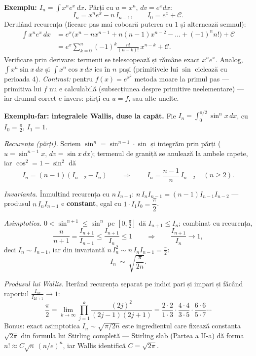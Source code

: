 \textbf{Exemplu: $I_n=\displaystyle\int x^n e^x\,dx$.} Părți cu $u=x^n$, $dv=e^x dx$:
\[
I_n=x^n e^x-n\,I_{n-1},\qquad I_0=e^x+\mathcal C.
\]
Derulând recurența (fiecare pas mai coboară puterea cu $1$ și alternează semnul):
\[
\begin{aligned}
\int x^n e^x\,dx&=e^{x}\Big(x^n-nx^{n-1}+n(n-1)x^{n-2}-\dots+(-1)^n n!\Big)+\mathcal C\\
&=e^x\sum_{k=0}^{n}(-1)^k\frac{n!}{(n-k)!}\,x^{n-k}+\mathcal C.
\end{aligned}
\]
Verificare prin derivare: termenii se telescopează și rămâne exact $x^ne^x$. Analog, $\int x^n\sin x\,dx$ și $\int x^n\cos x\,dx$ ies în $n$ pași (primitivele lui $\sin$ ciclează cu perioada $4$). \emph{Contrast:} pentru $f(x)=e^{x^2}$ metoda moare la primul pas --- primitiva lui $f$ nu e calculabilă (subsecțiunea despre primitive neelementare) --- iar drumul corect e invers: părți cu $u=f$, sau alte unelte.

\medskip
\textbf{Exemplu-far: integralele Wallis, duse la capăt.} Fie $I_n=\displaystyle\int_0^{\pi/2}\sin^n x\,dx$, cu $I_0=\frac\pi2$, $I_1=1$.

\emph{Recurența (părți).} Scriem $\sin^n=\sin^{n-1}\cdot\sin$ și integrăm prin părți ($u=\sin^{n-1}x$, $dv=\sin x\,dx$); termenul de graniță se anulează la ambele capete, iar $\cos^2=1-\sin^2$ dă
\[
I_n=(n-1)(I_{n-2}-I_n)
\qquad\Longrightarrow\qquad
\boxed{\,I_n=\frac{n-1}{n}\,I_{n-2}\,}\quad(n\ge2).
\]

\emph{Invarianta.} Înmulțind recurența cu $n\,I_{n-1}$: $n\,I_nI_{n-1}=(n-1)I_{n-1}I_{n-2}$ --- produsul $n\,I_nI_{n-1}$ e \textbf{constant}, egal cu $1\cdot I_1I_0=\dfrac\pi2$.

\emph{Asimptotica.} $0<\sin^{n+1}\le\sin^n$ pe $[0,\frac\pi2]$ dă $I_{n+1}\le I_n$; combinat cu recurența,
\[
\frac{n}{n+1}=\frac{I_{n+1}}{I_{n-1}}\le\frac{I_{n+1}}{I_n}\le1
\qquad\Longrightarrow\qquad
\frac{I_{n+1}}{I_n}\to1,
\]
deci $I_n\sim I_{n-1}$, iar din invariantă $n\,I_n^2\sim n\,I_nI_{n-1}=\frac\pi2$:
\[
I_n\ \sim\ \sqrt{\frac{\pi}{2n}}.
\]

\emph{Produsul lui Wallis.} Iterând recurența separat pe indici pari și impari și făcând raportul $\frac{I_{2k}}{I_{2k+1}}\to1$:
\[
\frac\pi2=\lim_{k\to\infty}\prod_{j=1}^{k}\frac{(2j)^2}{(2j-1)(2j+1)}=\frac{2\cdot2}{1\cdot3}\cdot\frac{4\cdot4}{3\cdot5}\cdot\frac{6\cdot6}{5\cdot7}\cdots
\]
 Bonus: exact asimptotica $I_n\sim\sqrt{\pi/2n}$ este ingredientul care fixează constanta $\sqrt{2\pi}$ din formula lui Stirling completă --- Stirling slab (Partea a II-a) dă forma $n!\approx C\sqrt n\,(n/e)^n$, iar Wallis identifică $C=\sqrt{2\pi}$.

